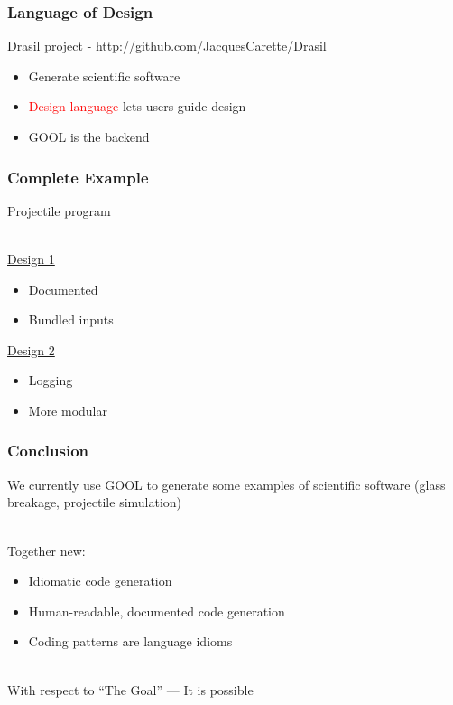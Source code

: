 \documentclass{beamer}
\begin{document}

\begin{frame}

\frametitle{Language of Design}

Drasil project - \url{http://github.com/JacquesCarette/Drasil}
\begin{itemize}
\item Generate scientific software
\item \textcolor{red}{Design language} lets users guide design
\item GOOL is the backend
\end{itemize}

\end{frame}


\begin{frame}

\frametitle{Complete Example}

Projectile program\\~\

\href{https://github.com/JacquesCarette/Drasil/tree/projectileDemos/Presentations/PEPM2020/projectile1}{Design
 1}
\begin{itemize}
	\item Documented
	\item Bundled inputs
\end{itemize}

\href{https://github.com/JacquesCarette/Drasil/tree/projectileDemos/Presentations/PEPM2020/projectile2}{Design
 2}
\begin{itemize}
	\item Logging
	\item More modular
\end{itemize}

\end{frame}


\begin{frame}

\frametitle{Conclusion}

We currently use GOOL to generate some examples of scientific software (glass 
breakage, projectile simulation)\\~\

Together new:
\begin{itemize}
  \item Idiomatic code generation
  \item Human-readable, documented code generation
  \item Coding patterns are language idioms\\~\
\end{itemize}

With respect to ``The Goal'' --- It is possible\\~\

\end{frame}
\end{document}
